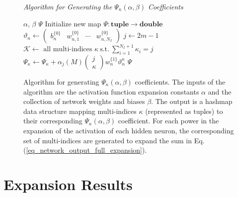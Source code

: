 \begin{figure}
	\centering
	\textit{Algorithm for Generating the $\Psi_\kappa(\alpha, \beta)$ Coefficients}\par
	\begin{framed}
		\begin{algorithmic}[1]
			\renewcommand{\algorithmicrequire}{\textbf{Input:}}
			\renewcommand{\algorithmicensure}{\textbf{Output:}}
			\REQUIRE $\alpha$, $\beta$ 
			\ENSURE  $\Psi$
			\STATE Initialize new map $\Psi:\textbf{tuple}\to\textbf{double}$
			\STATE $\vartheta_n \gets \begin{pmatrix}
				b_n^{\{0\}} & w_{n,1}^{\{0\}} & \cdots & w_{n,N_I}^{\{0\}}
			\end{pmatrix}$
			\STATE $j \gets 2m-1$
			\STATE $\mathcal{K} \gets
			\textrm{\ all\ multi-indices\ }
			\kappa \mathrm{\ s.t.}\ \sum_{i=1}^{N_I + 1}\kappa_i = j$
			\STATE $\Psi_{\kappa} \gets \Psi_{\kappa} + 
			\alpha_j(M)
			\begin{pmatrix}j \\ \kappa \end{pmatrix}
			w_n^{\{1\}} \vartheta_n^{\kappa}$
			\ENDFOR
			\ENDFOR
			\ENDFOR
			\RETURN $\Psi$
		\end{algorithmic}
	\end{framed}
	\caption[Algorithm for Generating $\Psi_{\kappa}(\alpha, \beta)$ Coefficients]{Algorithm for generating $\Psi_{\kappa}(\alpha, \beta)$ coefficients.  The inputs of the algorithm are the activation function expansion constants $\alpha$ and the collection of network weights and biases $\beta$.  The output is a hashmap data structure mapping multi-indices $\kappa$ (represented as tuples) to their corresponding $\Psi_\kappa(\alpha, \beta)$ coefficient.  For each power in the expansion of the activation of each hidden neuron, the corresponding set of multi-indices are generated to expand the sum in Eq. (\ref{eq_network_output_full_expansion}).}
	\label{fig_generate_psi}
\end{figure}

\section{Expansion Results}

\label{section_expansion_results}

